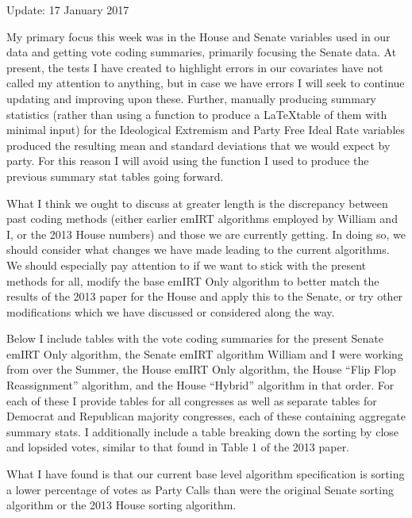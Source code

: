 \documentclass[12pt]{article}
\begin{document}
	

\begin{center}
	Update: 17 January 2017
\end{center}

My primary focus this week was in the House and Senate variables used in our data and getting vote coding summaries, primarily focusing the Senate data. At present, the tests I have created to highlight errors in our covariates have not called my attention to anything, but in case we have errors I will seek to continue updating and improving upon these. Further, manually producing summary statistics (rather than using a function to produce a \LaTeX table of them with minimal input) for the Ideological Extremism and Party Free Ideal Rate variables produced the resulting mean and standard deviations that we would expect by party. For this reason I will avoid using the function I used to produce the previous summary stat tables going forward.

What I think we ought to discuss at greater length is the discrepancy between past coding methods (either earlier emIRT algorithms employed by William and I, or the 2013 House numbers) and those we are currently getting. In doing so, we should consider what changes we have made leading to the current algorithms. We should especially pay attention to if we want to stick with the present methods for all, modify the base emIRT Only algorithm to better match the results of the 2013 paper for the House and apply this to the Senate, or try other modifications which we have discussed or considered along the way.

Below I include tables with the vote coding summaries for the present Senate emIRT Only algorithm, the Senate emIRT algorithm William and I were working from over the Summer, the House emIRT Only algorithm, the House ``Flip Flop Reassignment'' algorithm, and the House ``Hybrid'' algorithm in that order. For each of these I provide tables for all congresses as well as separate tables for Democrat and Republican majority congresses, each of these containing aggregate summary stats. I additionally include a table breaking down the sorting by close and lopsided votes, similar to that found in Table 1 of the 2013 paper. 

What I have found is that our current base level algorithm specification is sorting a lower percentage of votes as Party Calls than were the original Senate sorting algorithm or the 2013 House sorting algorithm. 

$ $
\end{document}
